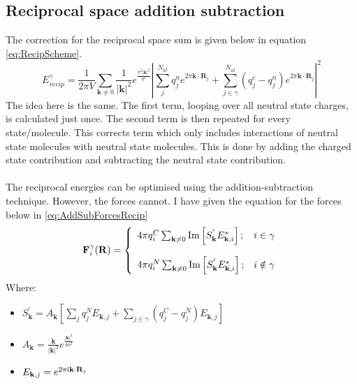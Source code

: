 \subsection{Reciprocal space addition subtraction}
The correction for the reciprocal space sum is given below in equation \eqref{eq:RecipScheme}.
\begin{equation}
  E^{\gamma}_{recip} = \frac{1}{2 \pi V} \sum_{\mathbf{k} \neq 0} \frac{1}{|\mathbf{k}|^2} e^{\frac{\pi^2 |\mathbf{k}|^2}{\eta^2}} \left| \sum_{j}^{N_{at}} q^{n}_{j} e^{2 \pi \mathbf{k} \cdot \mathbf{R}_{j}}  + \sum_{j \in \gamma}^{N_{at}} (q^{c}_{j} - q^n_j) e^{2 \pi \mathbf{k} \cdot \mathbf{R}_{j}} \right| ^2
  \label{eq:RecipScheme}
\end{equation}
The idea here is the same. The first term, looping over all neutral state charges, is calculated just once. The second term is then repeated for every state/molecule. This corrects term  which only includes interactions of neutral state molecules with neutral state molecules. This is done by adding the charged state contribution and subtracting the neutral state contribution.
\\\\
The reciprocal energies can be optimised using the addition-subtraction technique. However, the forces cannot. I have given the equation for the forces below in \eqref{eq:AddSubForcesRecip}
\begin{equation}
    \mathbf{F}_{i}^{\gamma}(\mathbf{R}) =  \left\lbrace \begin{array}{lc}
      4\pi q_{i}^{C} \sum_{\mathbf{k} \neq 0} \mathrm{Im}\left[ S^{'}_{\mathbf{k}} E_{\mathbf{k},i}^{*} \right]; & i  \in \gamma\\\\
    
    4\pi q_{i}^{N} \sum_{\mathbf{k} \neq 0} \mathrm{Im}\left[ S^{'}_{\mathbf{k}} E_{\mathbf{k},i}^{*} \right];& i     \notin \gamma
    \end{array}
    \right.
    \label{eq:AddSubForcesRecip}
\end{equation}
Where:
\begin{itemize}
  \item $S_{\mathbf{k}}^{'} = A_{\mathbf{k}} \left[\sum_{j} q_j^{N} E_{\mathbf{k}, j} + \sum_{j \in \gamma}           \left(q_j^{C} - q_{j}^{N}\right) E_{\mathbf{k}, j}\right]$

  \item $A_{\mathbf{k}} = \frac{\mathbf{k}}{|\mathbf{k}|^2} e^{\frac{|\mathbf{k}|^2}{4 \alpha^2}}$

  \item $E_{\mathbf{k}, j} = e^{2 \pi \mathrm{i} \mathbf{k} \cdot \mathbf{R}_{j}}$
\end{itemize}
